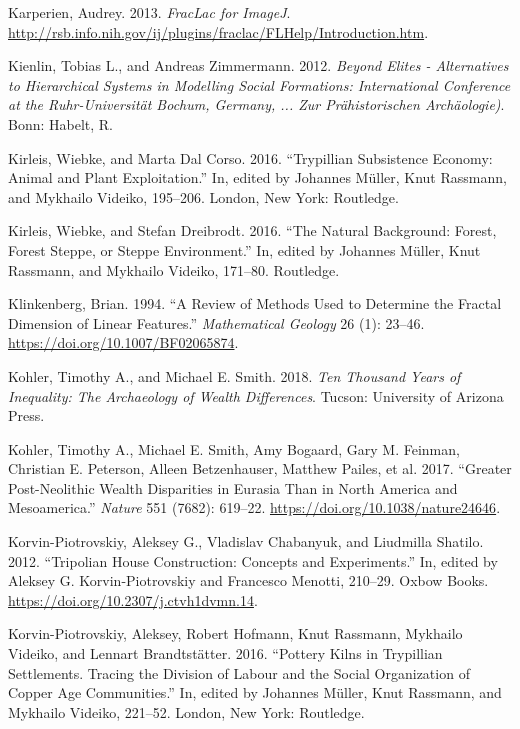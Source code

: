 \documentclass[
  12pt,
  a4paper, twoside]{book}
\newlength{\cslhangindent}
\newlength{\cslentryspacingunit} %
\newenvironment{CSLReferences}[2] %
 {%
  \setlength{\parindent}{0pt}
  \ifodd #1
  \let\oldpar\par
  \def\par{\hangindent=\cslhangindent\oldpar}
  \fi
  \setlength{\parskip}{#2\cslentryspacingunit}
 }%
 {}
\begin{document}
\begin{CSLReferences}{1}{0}
\leavevmode{}%
Karperien, Audrey. 2013. \emph{FracLac for ImageJ}. \url{http://rsb.info.nih.gov/ij/plugins/fraclac/FLHelp/Introduction.htm}.

\leavevmode{}%
Kienlin, Tobias L., and Andreas Zimmermann. 2012. \emph{Beyond Elites - Alternatives to Hierarchical Systems in Modelling Social Formations: International Conference at the Ruhr-Universität Bochum, Germany, ... Zur Prähistorischen Archäologie)}. Bonn: Habelt, R.

\leavevmode{}%
Kirleis, Wiebke, and Marta Dal Corso. 2016. {``Trypillian Subsistence Economy: Animal and Plant Exploitation.''} In, edited by Johannes Müller, Knut Rassmann, and Mykhailo Videiko, 195--206. London, New York: Routledge.

\leavevmode{}%
Kirleis, Wiebke, and Stefan Dreibrodt. 2016. {``The Natural Background: Forest, Forest Steppe, or Steppe Environment.''} In, edited by Johannes Müller, Knut Rassmann, and Mykhailo Videiko, 171--80. Routledge.

\leavevmode{}%
Klinkenberg, Brian. 1994. {``A Review of Methods Used to Determine the Fractal Dimension of Linear Features.''} \emph{Mathematical Geology} 26 (1): 23--46. \url{https://doi.org/10.1007/BF02065874}.

\leavevmode{}%
Kohler, Timothy A., and Michael E. Smith. 2018. \emph{Ten Thousand Years of Inequality: The Archaeology of Wealth Differences}. Tucson: University of Arizona Press.

\leavevmode{}%
Kohler, Timothy A., Michael E. Smith, Amy Bogaard, Gary M. Feinman, Christian E. Peterson, Alleen Betzenhauser, Matthew Pailes, et al. 2017. {``Greater Post-Neolithic Wealth Disparities in Eurasia Than in North America and Mesoamerica.''} \emph{Nature} 551 (7682): 619--22. \url{https://doi.org/10.1038/nature24646}.

\leavevmode{}%
Korvin-Piotrovskiy, Aleksey G., Vladislav Chabanyuk, and Liudmilla Shatilo. 2012. {``Tripolian House Construction: Concepts and Experiments.''} In, edited by Aleksey G. Korvin-Piotrovskiy and Francesco Menotti, 210--29. Oxbow Books. \url{https://doi.org/10.2307/j.ctvh1dvmn.14}.

\leavevmode{}%
Korvin-Piotrovskiy, Aleksey, Robert Hofmann, Knut Rassmann, Mykhailo Videiko, and Lennart Brandtstätter. 2016. {``Pottery Kilns in Trypillian Settlements. Tracing the Division of Labour and the Social Organization of Copper Age Communities.''} In, edited by Johannes Müller, Knut Rassmann, and Mykhailo Videiko, 221--52. London, New York: Routledge.


\end{CSLReferences}
\end{document}
